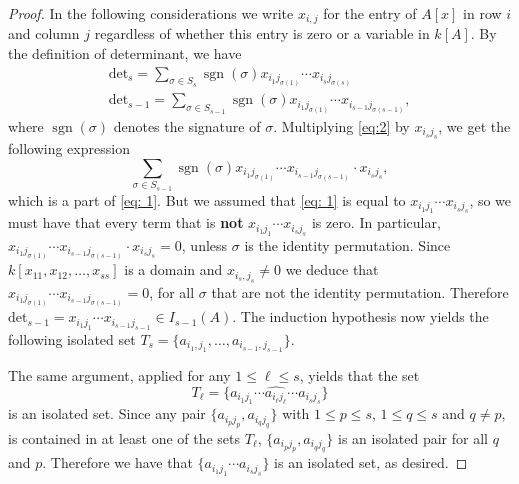 \documentclass[10pt,a4paper]{amsart}
\theoremstyle{plain}
\theoremstyle{definition}
\DeclareMathOperator{\sgn}{sgn}
\begin{document}
\begin{proof}
In the following considerations we write $x_{i,j}$ for the entry of $A[x]$ in row $i$ and column $j$ regardless of whether this entry is zero or a variable in $k[A]$. By the definition of determinant, we have 
\begin{align}
\text{det}_s  = \sum_{\sigma \in S_s}\sgn(\sigma)x_{i_1 j_{\sigma(1)}}\cdots x_{i_sj_{\sigma(s)}} \label{eq: 1}\\
\text{det}_{s-1}= \sum_{\sigma \in S_{s-1}}\sgn(\sigma)x_{i_1 j_{\sigma(1)}}\cdots x_{i_{s-1}j_{\sigma(s-1)}},  \label{eq:2}
\end{align}
where $\sgn(\sigma)$ denotes the signature of $\sigma.$
Multiplying \eqref{eq:2} by $x_{i_s j_s}$, we get the following expression
\[
\sum_{\sigma \in S_{s-1}}\sgn(\sigma)x_{i_1 j_{\sigma(1)}}\cdots x_{i_{s-1}j_{\sigma(s-1)}}\cdot x_{i_s j_s},
\]
which is a part of \eqref{eq: 1}. But we assumed that \eqref{eq: 1} is equal to $x_{i_1 j_1}\cdots x_{i_sj_s}$, so we must have that every term that is \textbf{not} $x_{i_1 j_1}\cdots x_{i_sj_s}$ is zero. In particular, $x_{i_1 j_{\sigma(1)}}\cdots x_{i_{s-1}j_{\sigma(s-1)}}\cdot x_{i_s j_s}=0$, unless $\sigma$ is the identity permutation. Since $k[x_{11},x_{12},\ldots, x_{ss}]$ is a domain and $x_{i_s,j_s}\neq 0$ we deduce that $x_{i_1 j_{\sigma(1)}}\cdots x_{i_{s-1}j_{\sigma(s-1)}}=0$, for all $\sigma$ that are not the identity permutation. Therefore  $\text{det}_{s-1}=x_{i_1 j_1}\cdots x_{i_{s-1}j_{s-1}}\in I_{s-1}(A)$.
The induction hypothesis now yields the following isolated set 
$T_{s}=\{a_{i_1,j_1},\ldots, a_{i_{s-1},j_{s-1}}\}$.



The same argument, applied for any $1\leq \ell \leq s$, yields that the set
\[
T_\ell=\{a_{i_1 j_1}\cdots \widehat{a_{i_\ell j_\ell}} \cdots a_{i_{s}j_{s}}\}
\]
is an isolated set. Since any pair $\{a_{i_p j_p},a_{i_qj_q}\}$  with $1\leq p \leq s$, $1\leq q\leq s$ and $q\neq p$, is contained in at least one of the sets  $T_\ell$, $\{a_{i_p j_p},a_{i_qj_q}\}$  is an isolated pair for all $q$ and $p$. Therefore we have that $\{a_{i_1 j_1}\cdots a_{i_{s}j_{s}}\}$ is an isolated set, as desired.
\end{proof}
\end{document}
